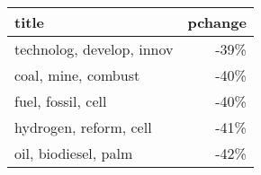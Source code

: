 \begin{tabular}{p{1.2cm}r}
\toprule
                     title &  pchange \\
\midrule
 technolog, develop, innov &     -39\% \\
       coal, mine, combust &     -40\% \\
        fuel, fossil, cell &     -40\% \\
    hydrogen, reform, cell &     -41\% \\
      oil, biodiesel, palm &     -42\% \\
\bottomrule
\end{tabular}
